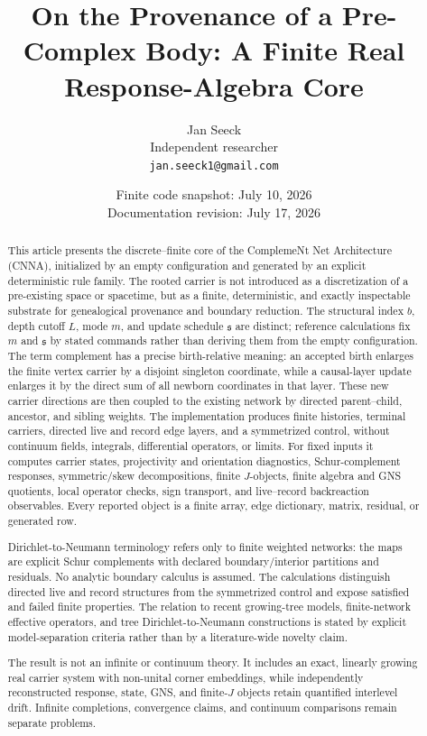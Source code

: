 \documentclass[11pt]{article}
\theoremstyle{remark}
\numberwithin{equation}{section}
\begin{document}
\title{On the Provenance of a Pre-Complex Body: A Finite Real Response-Algebra Core}
\author{Jan Seeck\\Independent researcher\\\texttt{jan.seeck1@gmail.com}}
\date{Finite code snapshot: July 10, 2026\\Documentation revision: July 17, 2026}
\maketitle
\begin{abstract}
This article presents the discrete--finite core of the ComplemeNt Net Architecture (CNNA), initialized by an empty configuration and generated by an explicit deterministic rule family. The rooted carrier is not introduced as a discretization of a pre-existing space or spacetime, but as a finite, deterministic, and exactly inspectable substrate for genealogical provenance and boundary reduction. The structural index \(b\), depth cutoff \(L\), mode \(m\), and update schedule \(\mathfrak{s}\) are distinct; reference calculations fix \(m\) and \(\mathfrak{s}\) by stated commands rather than deriving them from the empty configuration. The term complement has a precise birth-relative meaning: an accepted birth enlarges the finite vertex carrier by a disjoint singleton coordinate, while a causal-layer update enlarges it by the direct sum of all newborn coordinates in that layer. These new carrier directions are then coupled to the existing network by directed parent--child, ancestor, and sibling weights. The implementation produces finite histories, terminal carriers, directed live and record edge layers, and a symmetrized control, without continuum fields, integrals, differential operators, or limits. For fixed inputs it computes carrier states, projectivity and orientation diagnostics, Schur-complement responses, symmetric/skew decompositions, finite \(J\)-objects, finite algebra and GNS quotients, local operator checks, sign transport, and live--record backreaction observables. Every reported object is a finite array, edge dictionary, matrix, residual, or generated row.

Dirichlet-to-Neumann terminology refers only to finite weighted networks: the maps are explicit Schur complements with declared boundary/interior partitions and residuals. No analytic boundary calculus is assumed. The calculations distinguish directed live and record structures from the symmetrized control and expose satisfied and failed finite properties. The relation to recent growing-tree models, finite-network effective operators, and tree Dirichlet-to-Neumann constructions is stated by explicit model-separation criteria rather than by a literature-wide novelty claim.

The result is not an infinite or continuum theory. It includes an exact, linearly growing real carrier system with non-unital corner embeddings, while independently reconstructed response, state, GNS, and finite-\(J\) objects retain quantified interlevel drift. Infinite completions, convergence claims, and continuum comparisons remain separate problems.
\end{abstract}
\newpage
\tableofcontents
\newpage
\end{document}

